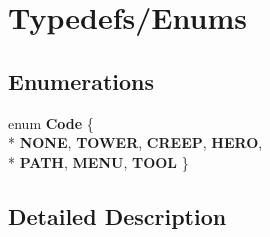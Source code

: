 \hypertarget{group___t_y_p_e_d_e_f_s}{\section{Typedefs/\+Enums}
\label{group___t_y_p_e_d_e_f_s}
}
\subsection*{Enumerations}
\begin{DoxyCompactItemize}
\item 
\hypertarget{group___t_y_p_e_d_e_f_s_gaf31477bc48f67856bedb0fa8e5b5281d}{enum {\bfseries Code} \{ \\*
{\bfseries N\+O\+N\+E}, 
{\bfseries T\+O\+W\+E\+R}, 
{\bfseries C\+R\+E\+E\+P}, 
{\bfseries H\+E\+R\+O}, 
\\*
{\bfseries P\+A\+T\+H}, 
{\bfseries M\+E\+N\+U}, 
{\bfseries T\+O\+O\+L}
 \}}\label{group___t_y_p_e_d_e_f_s_gaf31477bc48f67856bedb0fa8e5b5281d}

\end{DoxyCompactItemize}


\subsection{Detailed Description}
